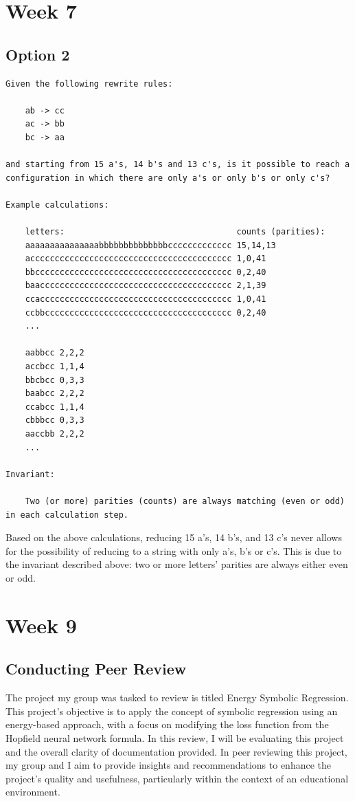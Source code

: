 \documentclass{article}
\theoremstyle{theorem}
\theoremstyle{definition}
\theoremstyle{remark}
\begin{document}
\section{Week 7}

\subsection{Option 2}

\begin{lstlisting}
Given the following rewrite rules:

    ab -> cc
    ac -> bb
    bc -> aa

and starting from 15 a's, 14 b's and 13 c's, is it possible to reach a configuration in which there are only a's or only b's or only c's?

Example calculations: 

    letters:                                   counts (parities):
    aaaaaaaaaaaaaaabbbbbbbbbbbbbbccccccccccccc 15,14,13
    accccccccccccccccccccccccccccccccccccccccc 1,0,41
    bbcccccccccccccccccccccccccccccccccccccccc 0,2,40
    baaccccccccccccccccccccccccccccccccccccccc 2,1,39
    ccaccccccccccccccccccccccccccccccccccccccc 1,0,41
    ccbbcccccccccccccccccccccccccccccccccccccc 0,2,40
    ...

    aabbcc 2,2,2
    accbcc 1,1,4
    bbcbcc 0,3,3
    baabcc 2,2,2
    ccabcc 1,1,4
    cbbbcc 0,3,3
    aaccbb 2,2,2
    ...

Invariant: 

    Two (or more) parities (counts) are always matching (even or odd) in each calculation step.
\end{lstlisting}

Based on the above calculations, reducing 15 a's, 14 b's, and 13 c's never allows for the possibility of reducing to a string with only a's, b's or c's. This is due to the invariant described above: two or more letters' parities are always either even or odd.

\section{Week 9}

\subsection{Conducting Peer Review}

The project my group was tasked to review is titled Energy Symbolic Regression. This project's objective is to apply the concept of symbolic regression using an energy-based approach, with a focus on modifying the loss function from the Hopfield neural network formula. In this review, I will be evaluating this project and the overall clarity of documentation provided. In peer reviewing this project, my group and I aim to provide insights and recommendations to enhance the project's quality and usefulness, particularly within the context of an educational environment. 
\end{document}

